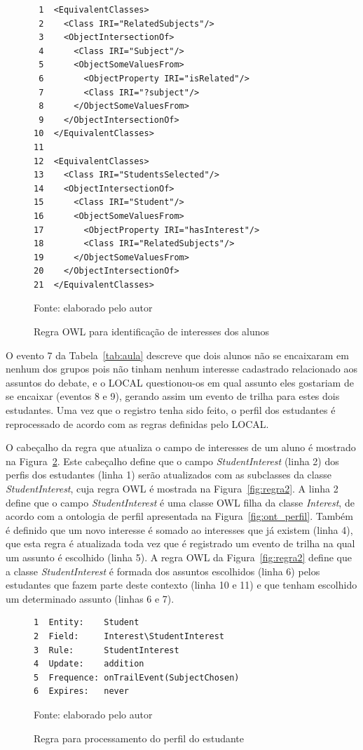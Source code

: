 \begin{figure}[!t]
  \caption{Regra OWL para identificação de interesses dos alunos}
\begin{verbatim}
 1  <EquivalentClasses>
 2    <Class IRI="RelatedSubjects"/>
 3    <ObjectIntersectionOf>
 4      <Class IRI="Subject"/>
 5      <ObjectSomeValuesFrom>
 6        <ObjectProperty IRI="isRelated"/>
 7        <Class IRI="?subject"/>
 8      </ObjectSomeValuesFrom>
 9    </ObjectIntersectionOf>
10  </EquivalentClasses>
11
12  <EquivalentClasses>
13    <Class IRI="StudentsSelected"/>
14    <ObjectIntersectionOf>
15      <Class IRI="Student"/>
16      <ObjectSomeValuesFrom>
17        <ObjectProperty IRI="hasInterest"/>
18        <Class IRI="RelatedSubjects"/>
19      </ObjectSomeValuesFrom>
20    </ObjectIntersectionOf>
21  </EquivalentClasses>
\end{verbatim}
  \label{fig:regra1}
  
Fonte: elaborado pelo autor
\end{figure}

O evento 7 da Tabela~\ref{tab:aula} descreve que dois alunos não se encaixaram em nenhum dos grupos pois não tinham nenhum interesse cadastrado relacionado aos assuntos do debate, e o LOCAL questionou-os em qual assunto eles gostariam de se encaixar (eventos 8 e 9), gerando assim um evento de trilha para estes dois estudantes. Uma vez que o registro tenha sido feito, o perfil dos estudantes é reprocessado de acordo com as regras definidas pelo LOCAL. 

O cabeçalho da regra que atualiza o campo de interesses de um aluno é mostrado na Figura~\ref{fig:regra3}. Este cabeçalho define que o campo {\em StudentInterest} (linha 2) dos perfis dos estudantes (linha 1) serão atualizados com as subclasses da classe {\em StudentInterest}, cuja regra OWL é mostrada na Figura~\ref{fig:regra2}. A linha 2 define que o campo {\em StudentInterest} é uma classe OWL filha da classe {\em Interest}, de acordo com a ontologia de perfil apresentada na Figura~\ref{fig:ont_perfil}. Também é definido que um novo interesse é somado ao interesses que já existem (linha 4), que esta regra é atualizada toda vez que é registrado um evento de trilha na qual um assunto é escolhido (linha 5). A regra OWL da Figura~\ref{fig:regra2} define que a classe {\em StudentInterest} é formada dos assuntos escolhidos (linha 6) pelos estudantes que fazem parte deste contexto (linha 10 e 11) e que tenham escolhido um determinado assunto (linhas 6 e 7).

\begin{figure}[!t]
  \caption{Regra para processamento do perfil do estudante}
\begin{verbatim}
1  Entity:    Student
2  Field:     Interest\StudentInterest
3  Rule:      StudentInterest
4  Update:    addition
5  Frequence: onTrailEvent(SubjectChosen)
6  Expires:   never
\end{verbatim}
  \label{fig:regra3}
  
Fonte: elaborado pelo autor
\end{figure}

